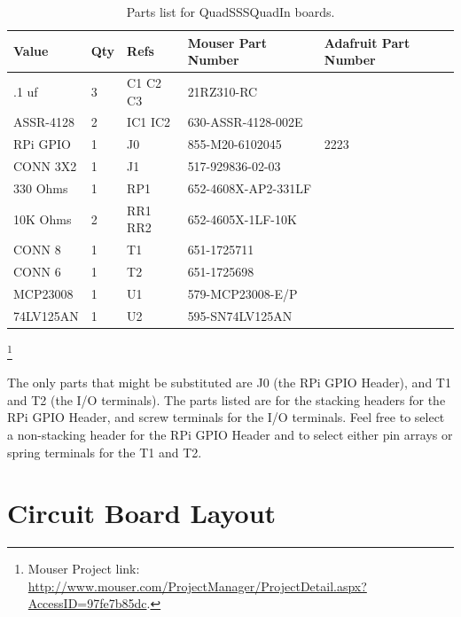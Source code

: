 \begin{table}[htp]
\begin{centering}\begin{tabular}{|l|l|p{1in}|l|p{.5in}|}
\hline
Value&Qty&Refs&Mouser Part Number&Adafruit Part Number\\
\hline
.1 uf&3&C1 C2 C3&21RZ310-RC&\\
\hline
ASSR-4128&2&IC1 IC2&630-ASSR-4128-002E&\\
\hline
RPi GPIO&1&J0&855-M20-6102045&2223\\
\hline
CONN 3X2&1&J1&517-929836-02-03&\\
\hline
330 Ohms&1&RP1&652-4608X-AP2-331LF&\\
\hline
10K Ohms&2&RR1 RR2&652-4605X-1LF-10K&\\
\hline
CONN 8&1&T1&651-1725711&\\
\hline
CONN 6&1&T2&651-1725698&\\
\hline
MCP23008&1&U1&579-MCP23008-E/P&\\
\hline
74LV125AN&1&U2&595-SN74LV125AN&\\
\hline
\end{tabular}
\caption{Parts list for QuadSSSQuadIn boards.}
\end{centering}\end{table}\footnote{Mouser Project link: 
\url{http://www.mouser.com/ProjectManager/ProjectDetail.aspx?AccessID=97fe7b85dc}.}

The only parts that might be substituted are J0 (the RPi GPIO Header), and T1
and T2 (the I/O terminals). The parts listed are for the stacking headers for 
the RPi GPIO Header, and screw terminals for the I/O terminals.  Feel free to 
select a non-stacking header for the RPi GPIO Header and to select either pin 
arrays or spring terminals for the T1 and T2.                   

\section{Circuit Board Layout}

